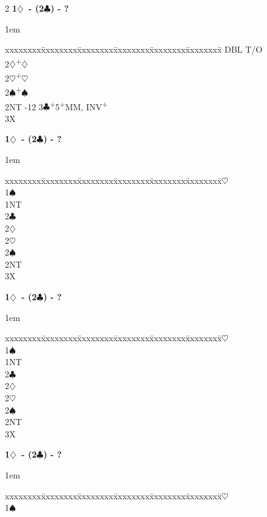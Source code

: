 \documentclass[10pt]{article}
\renewcommand{\c}{$\clubsuit$}
\renewcommand{\d}{$\diamondsuit$}
\newcommand{\h}{$\heartsuit$}
\newcommand{\s}{$\spadesuit$}
\newcommand{\p}{\textsuperscript{+}}
\newcommand{\x}{DBL}
\newenvironment{bidtable}[1][]
{\textbf{#1}
  \begin{adjustwidth}{1em}{}
    \addvspace{2pt}
    \begin{tabbing}
      xxxxxxxx\=xxxxxxxx\=xxxxxxxx\=xxxxxxxx\=xxxxxxxx\=xxxxxxxx\=\kill}
{\end{tabbing}\end{adjustwidth}\bigskip}%
\begin{document}
\begin{multicols*}{2}
\begin{bidtable}[1\d\ - (2\c) - ?]
\x \> T/O                               \\
2\d {}\p\d                               \\
2\h {}\p\h                               \\
2\s {}\p\s                               \\
2NT -12
3\c {}\p 5\p MM, INV\p                              \\
3X  \>                                \\
\end{bidtable}
\begin{bidtable}[1\d\ - (2\c) - ?]
1\h \>                                \\
1\s \>                                \\
1NT \>                                \\
2\c \>                                \\
2\d \>                                \\
2\h \>                                \\
2\s \>                                \\
2NT \>                                \\
3X  \>                                \\
\end{bidtable}
\begin{bidtable}[1\d\ - (2\c) - ?]
1\h \>                                \\
1\s \>                                \\
1NT \>                                \\
2\c \>                                \\
2\d \>                                \\
2\h \>                                \\
2\s \>                                \\
2NT \>                                \\
3X  \>                                \\
\end{bidtable}
\begin{bidtable}[1\d\ - (2\c) - ?]
1\h \>                                \\
1\s \>                                \\

\end{bidtable}
\end{multicols*}
\end{document}
